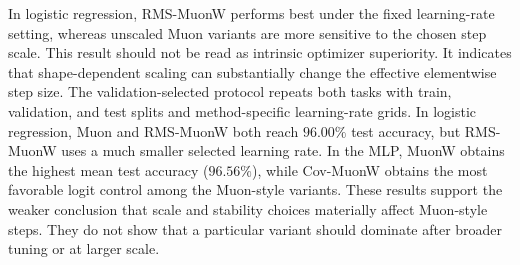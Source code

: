 \documentclass[sigconf,nonacm]{acmart}
\begin{document}
In logistic regression, RMS-MuonW performs best under the fixed learning-rate setting, whereas unscaled Muon variants are more sensitive to the chosen step scale. This result should not be read as intrinsic optimizer superiority. It indicates that shape-dependent scaling can substantially change the effective elementwise step size. The validation-selected protocol repeats both tasks with train, validation, and test splits and method-specific learning-rate grids. In logistic regression, Muon and RMS-MuonW both reach $96.00\%$ test accuracy, but RMS-MuonW uses a much smaller selected learning rate. In the MLP, MuonW obtains the highest mean test accuracy ($96.56\%$), while Cov-MuonW obtains the most favorable logit control among the Muon-style variants. These results support the weaker conclusion that scale and stability choices materially affect Muon-style steps. They do not show that a particular variant should dominate after broader tuning or at larger scale.

\begin{table}[t]
    \centering
    \caption{Small-scale Digits sanity check with logistic regression under the fixed-setting protocol. Test accuracy is averaged over five stratified splits.}
    \label{tab:digits_fixed_small}
    
\end{table}

\begin{table}[t]
    \centering
    \caption{Small-scale Digits sanity check with the MLP under the fixed-setting protocol. Test accuracy is averaged over five stratified splits.}
    \label{tab:mlp_fixed_small}
    
\end{table}

\begin{table}[t]
    \centering
    \caption{Validation-selected learning-rate sweep for the Digits sanity checks. Learning rates are selected on validation and evaluated on test.}
    \label{tab:classification_sweep_small}
    \setlength{\tabcolsep}{1.2pt}
    \scriptsize
    
\end{table}

\begin{table}[t]
    \centering
    \caption{Small-scale MLP stability sanity check under the fixed-setting protocol. Max logit and weight spectral norms are reported.}
    \label{tab:mlp_stability_small}
    
\end{table}
\end{document}
